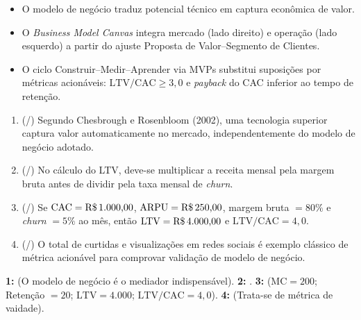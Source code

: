 \begin{boxResumo}
  \begin{itemize}[leftmargin=1.4em, itemsep=2pt]
    \item O modelo de negócio traduz potencial técnico em captura econômica de valor.
    \item O \textit{Business Model Canvas} integra mercado (lado direito) e operação (lado esquerdo) a partir do ajuste Proposta de Valor–Segmento de Clientes.
    \item O ciclo Construir–Medir–Aprender via MVPs substitui suposições por métricas acionáveis: $\text{LTV/CAC} \ge 3{,}0$ e \textit{payback} do CAC inferior ao tempo de retenção.
  \end{itemize}
\end{boxResumo}

\begin{boxTeste}
  \begin{enumerate}[leftmargin=1.5em, itemsep=4pt]
    \item (\V/\F) Segundo Chesbrough e Rosenbloom (2002), uma tecnologia superior captura valor automaticamente no mercado, independentemente do modelo de negócio adotado.
    \item (\V/\F) No cálculo do LTV, deve-se multiplicar a receita mensal pela margem bruta antes de dividir pela taxa mensal de \textit{churn}.
    \item (\V/\F) Se $\text{CAC} = \text{R\$\,1.000,00}$, $\text{ARPU} = \text{R\$\,250,00}$, margem bruta $= 80\%$ e \textit{churn} $= 5\%$ ao mês, então $\text{LTV} = \text{R\$\,4.000,00}$ e $\text{LTV/CAC} = 4{,}0$.
    \item (\V/\F) O total de curtidas e visualizações em redes sociais é exemplo clássico de métrica acionável para comprovar validação de modelo de negócio.
  \end{enumerate}
  \begin{boxGabarito}
    \textbf{1: \F} (O modelo de negócio é o mediador indispensável). \quad \textbf{2: \V}. \quad \textbf{3: \V} ($\text{MC} = 200$; Retenção $= 20$; $\text{LTV} = 4.000$; $\text{LTV/CAC} = 4{,}0$). \quad \textbf{4: \F} (Trata-se de métrica de vaidade).
  \end{boxGabarito}
\end{boxTeste}
